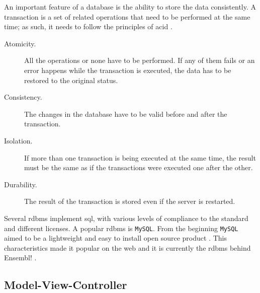 An important feature of a database is the ability to store the data consistently.
A transaction is a set of related operations that need to be performed at the same time; as such, it needs to follow the principles of \gls{acid} \citep{Haerder1983}.


\begin{description}
\item[Atomicity.] All the operations or none have to be performed. If any of them fails or an error happens while the transaction is executed, the data has to be restored to the original status. 
\item[Consistency.] The changes in the database have to be valid before and after the transaction. 
\item[Isolation.] If more than one transaction is being executed at the same time, the result must be the same as if the transactions were executed one after the other. 
\item[Durability.] The result of the transaction is stored even if the server is restarted.
\end{description}  


Several \gls{rdbms} implement \acrshort{sql}, with various levels of compliance to the standard and different licenses.  
A popular \acrshort{rdbms} is \texttt{MySQL}.
From the beginning \texttt{MySQL} aimed to be a lightweight and easy to install open source product \citep{Oracle2014}. 
This characteristics made it popular on the web and it is currently the \gls{rdbms} behind Ensembl! \citep{Flicek2012}. 

\subsection{Model-View-Controller}

